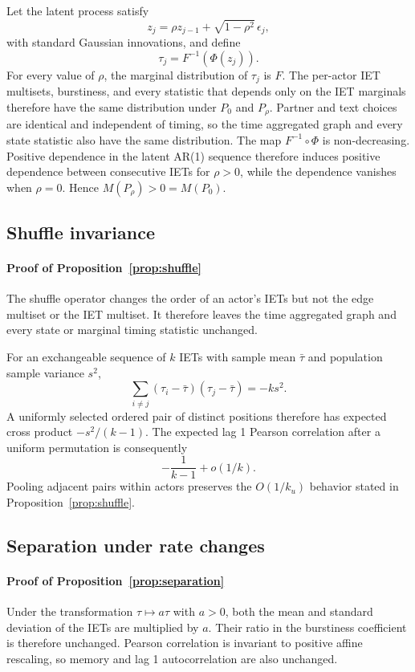 Let the latent process satisfy
\[
z_j=\rho z_{j-1}+\sqrt{1-\rho^2}\,\epsilon_j,
\]
with standard Gaussian innovations, and define
\[
\tau_j=F^{-1}\!\left(\Phi(z_j)\right).
\]
For every value of $\rho$, the marginal distribution of $\tau_j$ is $F$.
The per-actor IET multisets, burstiness, and every statistic that depends only
on the IET marginals therefore have the same distribution under $P_0$ and
$P_\rho$. Partner and text choices are identical and independent of timing, so
the time aggregated graph and every state statistic also have the same
distribution. The map $F^{-1}\circ\Phi$ is non-decreasing. Positive dependence
in the latent AR(1) sequence therefore induces positive dependence between
consecutive IETs for $\rho>0$, while the dependence vanishes when $\rho=0$.
Hence $M(P_\rho)>0=M(P_0)$.

\subsection{Shuffle invariance}

\paragraph{Proof of Proposition~\ref{prop:shuffle}}
The shuffle operator changes the order of an actor's IETs but not the edge
multiset or the IET multiset. It therefore leaves the time aggregated graph and
every state or marginal timing statistic unchanged.

For an exchangeable sequence of $k$ IETs with sample mean $\bar{\tau}$ and
population sample variance $s^2$,
\[
\sum_{i\neq j}(\tau_i-\bar{\tau})(\tau_j-\bar{\tau})=-ks^2.
\]
A uniformly selected ordered pair of distinct positions therefore has expected
cross product $-s^2/(k-1)$. The expected lag 1 Pearson correlation after a
uniform permutation is consequently
\[
-\frac{1}{k-1}+o(1/k).
\]
Pooling adjacent pairs within actors preserves the $O(1/k_u)$ behavior stated
in Proposition~\ref{prop:shuffle}.

\subsection{Separation under rate changes}

\paragraph{Proof of Proposition~\ref{prop:separation}}
Under the transformation $\tau\mapsto a\tau$ with $a>0$, both the mean and
standard deviation of the IETs are multiplied by $a$. Their ratio in the
burstiness coefficient is therefore unchanged. Pearson correlation is
invariant to positive affine rescaling, so memory and lag 1 autocorrelation are
also unchanged.

